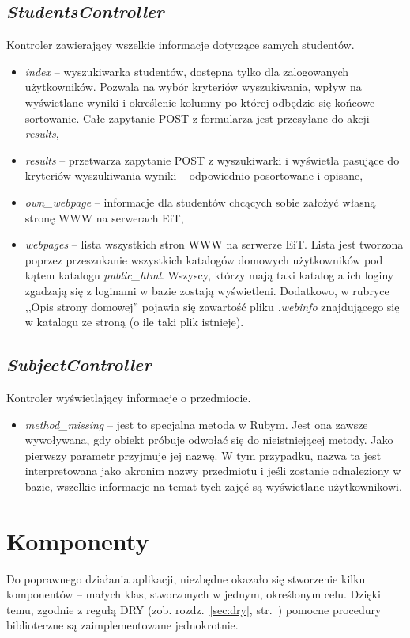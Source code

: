 \documentclass[a4paper,12pt,oneside]{report}
\begin{document}
\subsection{\emph{StudentsController}}
\label{con:students}
  Kontroler zawierający wszelkie informacje dotyczące samych studentów.
\begin{itemize}
  \item \emph{index} -- wyszukiwarka studentów, dostępna tylko dla zalogowanych użytkowników. Pozwala na wybór kryteriów wyszukiwania, wpływ na wyświetlane wyniki i określenie kolumny po której odbędzie się końcowe sortowanie. Całe zapytanie POST z formularza jest przesyłane do akcji \emph{results},
  \item \emph{results} -- przetwarza zapytanie POST z wyszukiwarki i wyświetla pasujące do kryteriów wyszukiwania wyniki -- odpowiednio posortowane i opisane,
  \item \emph{own\_webpage} -- informacje dla studentów chcących sobie założyć własną stronę WWW na serwerach EiT,
  \item \emph{webpages} -- lista wszystkich stron WWW na serwerze EiT. Lista jest tworzona poprzez przeszukanie wszystkich katalogów domowych użytkowników pod kątem katalogu \emph{public\_html}. Wszyscy, którzy mają taki katalog a ich loginy zgadzają się z loginami w bazie zostają wyświetleni. Dodatkowo, w rubryce ,,Opis strony domowej'' pojawia się zawartość pliku \emph{.webinfo} znajdującego się w katalogu ze stroną (o ile taki plik istnieje).
\end{itemize}

\subsection{\emph{SubjectController}}
\label{con:subject}
  Kontroler wyświetlający informacje o przedmiocie.
\begin{itemize}
  \item \emph{method\_missing} -- jest to specjalna metoda w Rubym. Jest ona zawsze wywoływana, gdy obiekt próbuje odwołać się do nieistniejącej metody. Jako pierwszy parametr przyjmuje jej nazwę. W tym przypadku, nazwa ta jest interpretowana jako akronim nazwy przedmiotu i jeśli zostanie odnaleziony w bazie, wszelkie informacje na temat tych zajęć są wyświetlane użytkownikowi.
\end{itemize}

\section{Komponenty}
\label{sec:components}
Do poprawnego działania aplikacji, niezbędne okazało się stworzenie kilku komponentów -- małych klas, stworzonych w jednym, określonym celu. Dzięki temu, zgodnie z regułą DRY (zob. rozdz.~\ref{sec:dry}, str.~\pageref{sec:dry}) pomocne procedury biblioteczne są zaimplementowane jednokrotnie.
\end{document}
